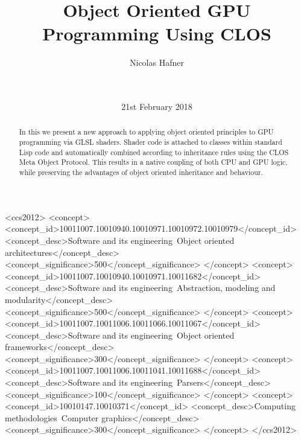 \documentclass{sig-alternate}
\begin{document}
\doi{}
\isbn{}

\begin{CCSXML}
  <ccs2012>
  <concept>
  <concept_id>10011007.10010940.10010971.10010972.10010979</concept_id>
  <concept_desc>Software and its engineering~Object oriented architectures</concept_desc>
  <concept_significance>500</concept_significance>
  </concept>
  <concept>
  <concept_id>10011007.10010940.10010971.10011682</concept_id>
  <concept_desc>Software and its engineering~Abstraction, modeling and modularity</concept_desc>
  <concept_significance>500</concept_significance>
  </concept>
  <concept>
  <concept_id>10011007.10011006.10011066.10011067</concept_id>
  <concept_desc>Software and its engineering~Object oriented frameworks</concept_desc>
  <concept_significance>300</concept_significance>
  </concept>
  <concept>
  <concept_id>10011007.10011006.10011041.10011688</concept_id>
  <concept_desc>Software and its engineering~Parsers</concept_desc>
  <concept_significance>100</concept_significance>
  </concept>
  <concept>
  <concept_id>10010147.10010371</concept_id>
  <concept_desc>Computing methodologies~Computer graphics</concept_desc>
  <concept_significance>300</concept_significance>
  </concept>
  </ccs2012>
\end{CCSXML}


\title{Object Oriented GPU Programming Using CLOS}

\author{
\alignauthor
Nicolas Hafner\\
       \\
       \\
}
\date{21st February 2018}

\maketitle

\begin{abstract}
  In this we present a new approach to applying object oriented principles to GPU programming via GLSL shaders. Shader code is attached to classes within standard Lisp code and automatically combined according to inheritance rules using the CLOS Meta Object Protocol. This results in a native coupling of both CPU and GPU logic, while preserving the advantages of object oriented inheritance and behaviour.
\end{abstract}
\end{document}
